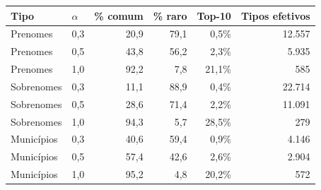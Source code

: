 \begin{tabular}{@{}llrrrr@{}}
\toprule
Tipo & $\alpha$ & \% comum & \% raro & Top-10 & Tipos efetivos \\
\midrule
Prenomes & 0,3 & 20,9 & 79,1 & 0,5\% & 12.557 \\
Prenomes & 0,5 & 43,8 & 56,2 & 2,3\% & 5.935 \\
Prenomes & 1,0 & 92,2 & 7,8 & 21,1\% & 585 \\
\midrule
Sobrenomes & 0,3 & 11,1 & 88,9 & 0,4\% & 22.714 \\
Sobrenomes & 0,5 & 28,6 & 71,4 & 2,2\% & 11.091 \\
Sobrenomes & 1,0 & 94,3 & 5,7 & 28,5\% & 279 \\
\midrule
Municípios & 0,3 & 40,6 & 59,4 & 0,9\% & 4.146 \\
Municípios & 0,5 & 57,4 & 42,6 & 2,6\% & 2.904 \\
Municípios & 1,0 & 95,2 & 4,8 & 20,2\% & 572 \\
\bottomrule
\end{tabular}
